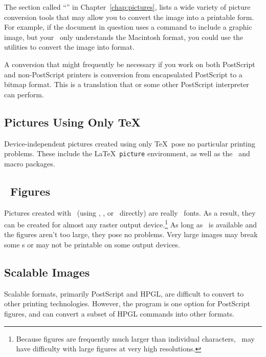 \newpage
The section called ``'' in Chapter~\ref{chap:pictures},
lists a wide variety of picture conversion
tools that may allow you to convert the image into a printable form.
For example, if the document in question uses a 
command to include a  graphic
image, but your \dvidriver\ only understands the Macintosh  format,
you could use the  utilities to convert the 
image into  format.

A conversion that might frequently be necessary if you work on both
PostScript and non-PostScript printers is  conversion from encapsulated
PostScript to a bitmap format.
This is a translation that  or some other PostScript
interpreter can perform.

\subsection{Pictures Using Only \protect\TeX}

Device-independent pictures created using only \TeX\ pose no particular
printing problems.  These include the \LaTeX\ \verb|picture| environment,
as well as the \PiCTeX\ and \program{\XYPic} macro packages.

\subsection{\protect\MF\ Figures}

Pictures created 
with \MF\ (using \program{\MFPic}, \program{\FigMF}, or \MF\ directly) are
really \MF\ fonts.  As a result, they can be created for almost
any raster output device.\footnote{Because figures are frequently much
larger than individual characters, \MF\ may have difficulty with large
figures at very high resolutions.}
As long as \MF\ is available and the figures aren't too large, they pose no
problems. Very large images may break some \dvidriver{}s or may not be
printable on some output devices.

\subsection{Scalable Images}

Scalable formats, 
primarily PostScript and HPGL, are difficult to convert
to other printing technologies.  However, the 
program is one option for PostScript figures, and  can
convert a subset of HPGL commands into other formats.


